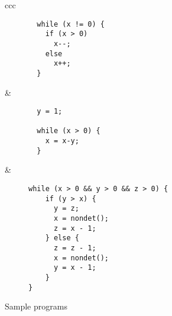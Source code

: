 \documentclass[preprint]{sigplanconf}
\theoremstyle{definition}
\begin{document}
\begin{figure*}
\begin{tabular}{ccc}
\begin{subfigure}[b]{0.3\textwidth}
\begin{lstlisting}
  while (x != 0) {
    if (x > 0)
      x--;
    else
      x++;
  }
\end{lstlisting}
\caption{}
 \label{fig:motivation.g}
\end{subfigure} 


&

\begin{subfigure}[b]{0.3\textwidth}
\begin{lstlisting}
  y = 1;

  while (x > 0) {
    x = x-y;
  }
\end{lstlisting}
\caption{}
 \label{fig:motivation.h}
\end{subfigure} 


&


\begin{subfigure}[b]{0.3\textwidth}
\begin{lstlisting}
while (x > 0 && y > 0 && z > 0) {
    if (y > x) {
      y = z;
      x = nondet();
      z = x - 1;
    } else {
      z = z - 1;
      x = nondet();
      y = x - 1;
    }
}
\end{lstlisting}
\caption{}
 \label{fig:motivation.i}
\end{subfigure} 



\end{tabular}
\caption{Sample programs}\label{fig:motivation}
\end{figure*}



\end{document}
